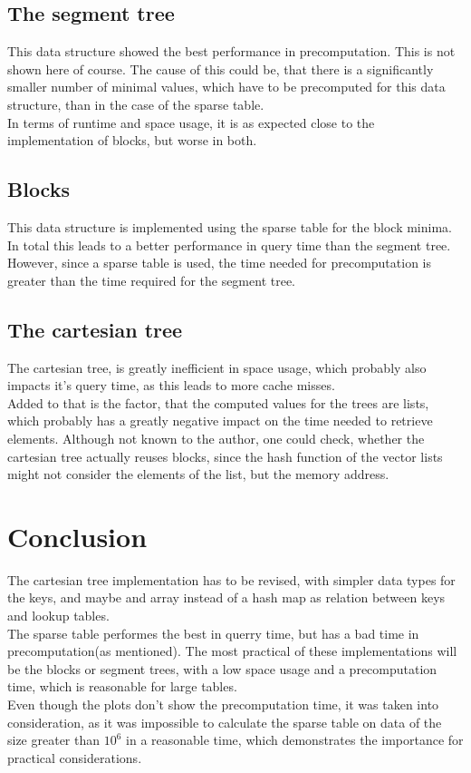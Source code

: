 \documentclass[a4paper,UKenglish,cleveref,thm-restate]{lipics-v2021}
\begin{document}
\subsection{The segment tree}
This data structure showed the best performance in precomputation. This is not shown here of course. The cause of this could be, that there is a significantly smaller number of minimal values, which have to be precomputed for this data structure, than in the case of the sparse table.\\
In terms of runtime and space usage, it is as expected close to the implementation of blocks, but worse in both.\\
\subsection{Blocks}
This data structure is implemented using the sparse table for the block minima. In total this leads to a better performance in query time than the segment tree.\\
However, since a sparse table is used, the time needed for precomputation is greater than the time required for the segment tree.
\subsection{The cartesian tree}
The cartesian tree, is greatly inefficient in space usage, which probably also impacts it's query time, as this leads to more cache misses.\\
Added to that is the factor, that the computed values for the trees are lists, which probably has a greatly negative impact on the time needed to retrieve elements. Although not known to the author, one could check, whether the cartesian tree actually reuses blocks, since the hash function of the vector lists might not consider the elements of the list, but the memory address.\\

\section{Conclusion}
The cartesian tree implementation has to be revised, with simpler data types for the keys, and maybe and array instead of a hash map as relation between keys and lookup tables.\\
The sparse table performes the best in querry time, but has a bad time in precomputation(as mentioned). The most practical of these implementations will be the blocks or segment trees, with a low space usage and a precomputation time, which is reasonable for large tables.\\
Even though the plots don't show the precomputation time, it was taken into consideration, as it was impossible to calculate the sparse table on data of the size greater than $10^6$ in a reasonable time, which demonstrates the importance for practical considerations.
\end{document}
